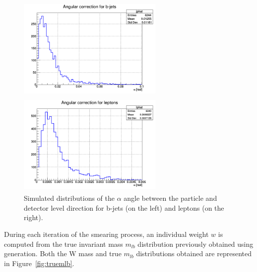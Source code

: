 \documentclass[a4paper, 10pt, openright]{report}
\begin{document}
\begin{figure}[htbp]
\centering
\begin{minipage}[b]{.48\textwidth}
\includegraphics[width=7cm, height=5cm]{figs/jphat.png}
\end{minipage}\hfill
\begin{minipage}[b]{.48\textwidth}
\includegraphics[width=7cm, height=5cm]{figs/lphat.png}
\end{minipage} \hfill
\caption{Simulated distributions of the $\alpha$ angle between the particle and detector level direction for b-jets (on the left) and leptons (on the right).}
\label{fig:angdistributions}
\end{figure}

During each iteration of the smearing process, an individual weight $w$ is computed from the true invariant mass $m_{lb}$ distribution previously obtained using generation. Both the W mass and true $m_{lb}$ distributions obtained are represented in Figure~\ref{fig:truemlb}.
\end{document}
